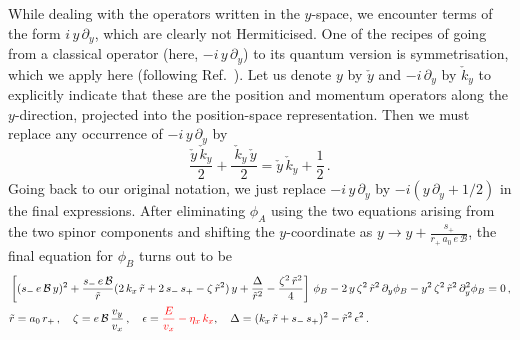 \documentclass[aps,prb, onecolumn, nofootinbib, citeautoscript,10pt]{revtex4-2}
\def \nn{\nonumber \\}
\begin{document}
\begin{widetext}
While dealing with the operators written in the $y$-space, we encounter terms of the form $i\, y\, \partial_y $, which are clearly not Hermiticised. One of the recipes of going from a classical operator (here, $ -i\, y\, \partial_y$) to its quantum version is symmetrisation, which we apply here (following Ref.~\cite{strained-dirac-franz}). Let us denote $y$ by $\check y$ and $-i\, \partial_y$ by $\check k_y$ to explicitly indicate that these are the position and momentum operators along the $y$-direction, projected into the position-space representation. Then we must replace any occurrence of $ -i\, y \,\partial_y $ by
$$ \frac{\check{y} \,\check{k}_y}{2}  +   \frac{\ \check{k}_y \, \check{y} }{2} = \check{y} \,\check{k}_y + \frac{1}{2} \,.$$
Going back to our original notation, we just replace $ -i\, y \,\partial_y $ by $-i\left ( y\,\partial_y + 1/2 \right)$ in the final expressions. After eliminating $\phi_A$ using the two equations arising from the two spinor components and shifting the $y$-coordinate as $ y\rightarrow y + 
\frac{s_+}{r_+ \,a_0\,  e\, {\mathcal B}}$, the final equation for $\phi_B$ turns out to be
\begin{align}
\label{eqdiffea}
& \left[(s_{-}\,e \, {\mathcal B}\,y)^2 + \frac{s_{-} \,e \, {\mathcal B}}{\tilde{r}}(2\,k_x\,\tilde{r}+2\,s_{-}\,s_+
-\zeta\,\tilde{r}^2)\,y+\frac{\Delta}{\tilde{r}^2}-\frac{\zeta^2\,\tilde{r}^2}{4} \right] \, \phi_B 
-2 \,y \, \zeta^2 \, \tilde{r}^2 \, \partial_y \phi_B-y^2 \, \zeta^2 \, \tilde{r}^2 \, \partial^2_y \phi_B = 0\,,
\nn & \tilde{r} = a_0 \, r_+ \,, \quad \zeta =  e \, {\mathcal B} \, \frac{v_y}{v_x} \,, \quad
\epsilon = \textcolor{red}{\frac{E}{v_x}- \eta_x \, k_x}, \quad
\Delta = (k_x \, \tilde r+ s_{-} \, s_+ )^2-\tilde r^2 \, \epsilon^2 \,.
\end{align}

\end{widetext}
\end{document}
